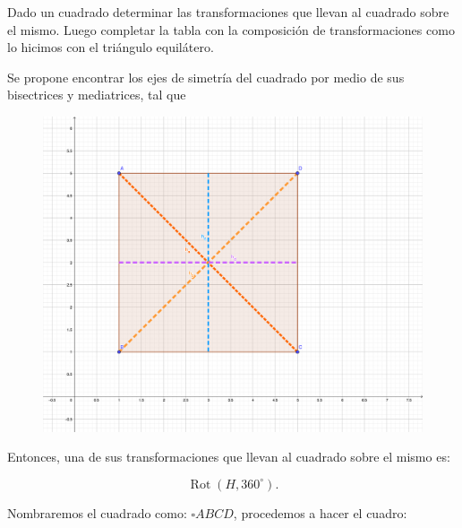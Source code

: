 








\begin{problema}
	Dado un cuadrado determinar las transformaciones que llevan al cuadrado sobre el mismo. Luego completar la tabla con la composición de transformaciones como lo hicimos con el triángulo equilátero.
\end{problema}

\begin{sol}
	Se propone encontrar los ejes de simetría del cuadrado por medio de sus bisectrices y mediatrices, tal que 
	
		\begin{figure}[H]
		\centering
		\includegraphics[scale=1.5]{Images/P2-1.png}
	\end{figure}

Entonces, una de sus transformaciones que llevan al cuadrado sobre el mismo es: 

$$\operatorname{Rot}(H, 360^{\circ}).$$

Nombraremos el cuadrado como: $\square ABCD$, procedemos a hacer el cuadro: 


\end{sol}
